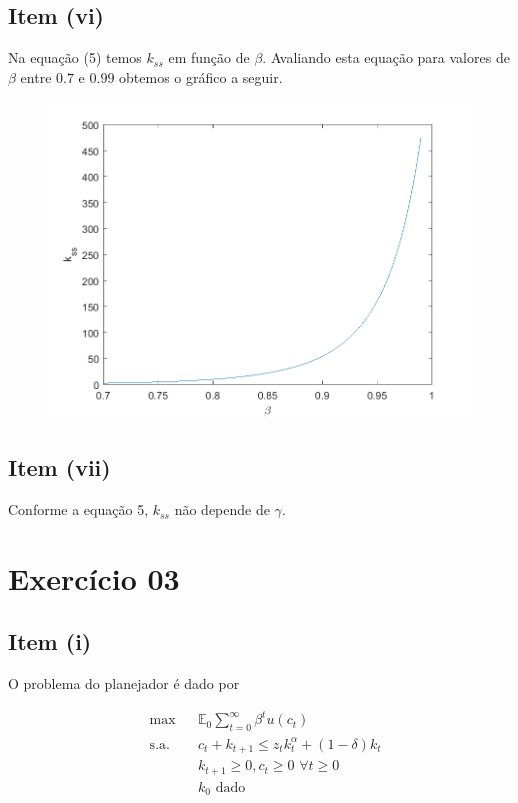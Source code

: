 \documentclass{article}
\begin{document}
\subsection*{Item (vi)}

Na equação (5) temos $k_{ss}$ em função de $\beta$. Avaliando esta equação para valores
de $\beta$ entre $0.7$ e $0.99$ obtemos o gráfico a seguir.

\begin{figure}[!h]
  \includegraphics[scale=0.6]{ex2/ex2_3.png}
\end{figure}

\subsection*{Item (vii)}

Conforme a equação 5, $k_{ss}$ não depende de $\gamma$.

\section*{Exercício 03}

\subsection*{Item (i)}

O problema do planejador é dado por 

\begin{equation}
\begin{aligned}
& \max & & \mathbb{E}_0 \sum_{t=0}^{\infty} \beta^t u(c_t) \\
& \text{s.a.} & &  c_t + k_{t+1} \leq z_t k_t^\alpha + (1-\delta) k_t \\
& & &  k_{t+1} \geq 0, c_t \geq 0 \,\, \forall t \geq 0  \\
& & &  k_0 \text{ dado} \\
\end{aligned}
\end{equation}
\end{document}
